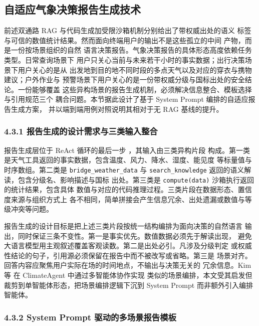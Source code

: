 \subsection{自适应气象决策报告生成技术}
\label{sec:report-generation}

前述双通路 RAG 与代码生成加受限沙箱机制分别给出了带权威出处的语义
标签与可信的数值统计结果。然而面向终端用户的输出不是这些孤立的中间
产物，而是一份按场景组织的自然
语言决策报告。气象决策报告的具体形态高度依赖任务类型。日常查询场景下
用户只关心当前与未来若干小时的事实数据；出行决策场景下用户关心的是从
出发地到目的地不同时段的多点天气以及对应的穿衣与携物建议；户外作业与
预警场景下用户关心的是一份带权威分级与国标出处的安全结论。一份能够覆盖
这些异构场景的报告生成机制，必须解决信息整合、模板选择与引用规范三个
耦合问题。本节据此设计了基于 System Prompt 编排的自适应报告生成方案，
并以端到端用例对照说明其相对于无 RAG 基线的提升。

\subsubsection*{4.3.1 \quad 报告生成的设计需求与三类输入整合}

报告生成层位于 ReAct 循环的最后一步 \cite{ref18}，其输入由三类异构片段
构成。第一类是天气工具返回的事实数据，包含温度、风力、降水、湿度、能见度
等标量值与时序数组。第二类是 \texttt{bridge\_\bk{}weather\_\bk{}data} 与
\texttt{search\_\bk{}knowledge} 返回的语义解读，包含分级名、影响描述与国标
出处。第三类是 \texttt{compute(data)} 沙箱执行返回的统计结果，包含具体
数值与对应的代码推理过程。三类片段在数据形态、置信度来源与组织方式上
各不相同，简单拼接会产生信息冗余、出处遗漏或数值与等级冲突等问题。

报告生成的设计目标是把上述三类片段按统一结构编排为面向决策的自然语言
输出，同时保证三条不变性。第一是事实优先。数值数据必须先于解读出现，
避免大语言模型用主观叙述覆盖客观读数。第二是出处必引。凡涉及分级判定
或权威性结论的句子，引用源必须保留在报告中而不被改写或省略。第三是
场景对齐。回答内容应聚焦用户实际在场的时间地点，不输出与决策无关的
冗余信息。Kim 等 \cite{ref1} 在 ClimateAgent 中通过多智能体协作实现
类似的场景编排，本文受其启发但裁剪到单智能体形态，把场景编排逻辑下沉到
System Prompt 而非额外引入编排智能体。

\subsubsection*{4.3.2 \quad System Prompt 驱动的多场景报告模板}

